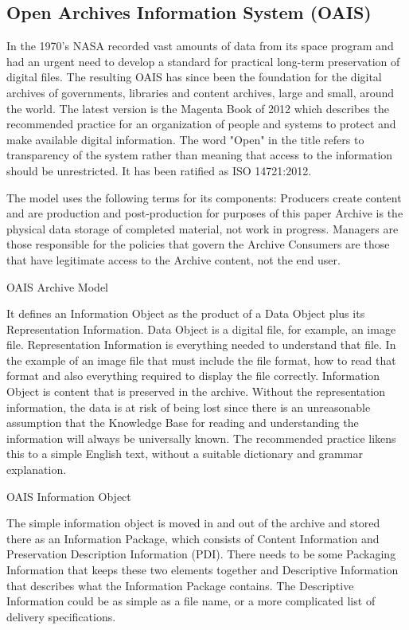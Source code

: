 \subsection{Open Archives Information System (OAIS)}%
\label{subsec:open-archives-information-system-oais}

In the 1970's NASA recorded vast amounts of data from its space program and had an urgent need to develop a standard for practical long-term preservation of digital files. The resulting OAIS has since been the foundation for the digital archives of governments, libraries and content archives, large and small, around the world. The latest version is the Magenta Book of 2012 which describes the recommended practice for an organization of people and systems to protect and make available digital information. The word "Open" in the title refers to transparency of the system rather than meaning that access to the information should be unrestricted. It has been ratified as ISO 14721:2012.

The model uses the following terms for its components:
Producers create content and are production and post-production for purposes of this paper
Archive is the physical data storage of completed material, not work in progress.
Managers are those responsible for the policies that govern the Archive
Consumers are those that have legitimate access to the Archive content, not the end user.


OAIS Archive Model

It defines an Information Object as the product of a Data Object plus its Representation Information.
Data Object is a digital file, for example, an image file.
Representation Information is everything needed to understand that file. In the example of an image file that must include the file format, how to read that format and also everything required to display the file correctly.
Information Object is content that is preserved in the archive. Without the representation information, the data is at risk of being lost since there is an unreasonable assumption that the Knowledge Base for reading and understanding the information will always be universally known. The recommended practice likens this to a simple English text, without a suitable dictionary and grammar explanation.

OAIS Information Object

The simple information object is moved in and out of the archive and stored there as an Information Package, which consists of Content Information and Preservation Description Information (PDI). There needs to be some Packaging Information that keeps these two elements together and Descriptive Information that describes what the Information Package contains. The Descriptive Information could be as simple as a file name, or a more complicated list of delivery specifications.

